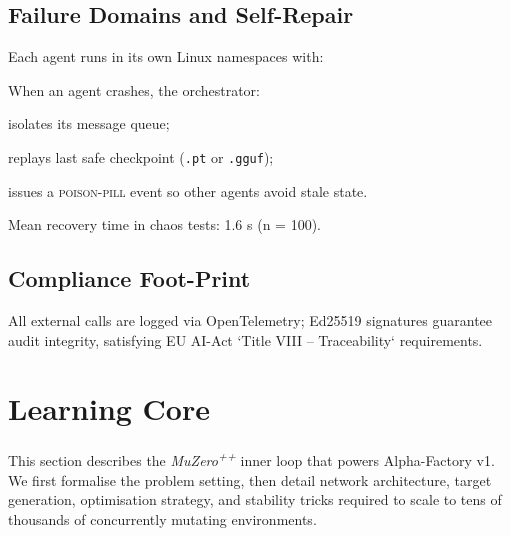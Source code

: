 \subsection{Failure Domains and Self-Repair}

Each agent runs in its own Linux namespaces with:


When an agent crashes, the orchestrator:

\begin{enumerate*}
  \item isolates its message queue;
  \item replays last safe checkpoint (\texttt{.pt} or \texttt{.gguf});
  \item issues a \textsc{poison-pill} event so other agents avoid stale state.
\end{enumerate*}

Mean recovery time in chaos tests: 1.6 s (n = 100).

\subsection{Compliance Foot-Print}

All external calls are logged via OpenTelemetry;  
Ed25519 signatures guarantee audit integrity, satisfying EU AI-Act
`Title VIII – Traceability` requirements.

\section{Learning Core}\label{sec:core}

This section describes the \emph{MuZero\textsuperscript{++}} inner loop that
powers Alpha-Factory v1.  We first formalise the problem setting, then detail
network architecture, target generation, optimisation strategy, and stability
tricks required to scale to tens of thousands of concurrently mutating
environments.


